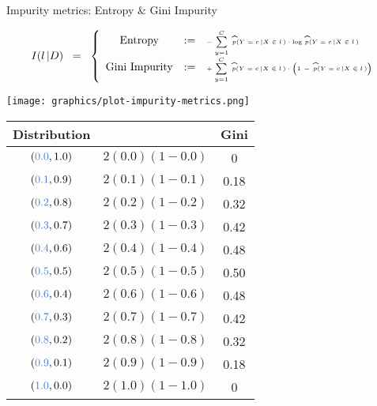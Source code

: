 \begin{frame}{\vskip -0.2cm \Large Impurity metrics: Entropy \& Gini Impurity}

\vskip -0.2cm
\tiny
\begin{equation*}
I(l\,\vert D)
\;\; = \;\;
\left\{\begin{array}{ccl}
\textnormal{Entropy}
& := &
	\textnormal{\tiny$-\;\overset{C}{\underset{y=1}{\sum}}\;\,
	\widehat{p}(Y=c\,\vert X\in l\,) \cdot \log\,\widehat{p}(Y=c\,\vert X\in l\,)$}
\\
\textnormal{Gini Impurity}
& := &
	\textnormal{\tiny$+\;\overset{C}{\underset{y=1}{\sum}}\;\,
	\widehat{p}(Y=c\,\vert X\in l\,) \cdot
	\left(\overset{{\color{white}.}}{1}\,-\,\widehat{p}(Y=c\,\vert X\in l\,)\right)$}
\end{array}\right.
\end{equation*}

\begin{multicols}{2}

	\begin{minipage}{4.5cm}
	\begin{flushright}
	\texttt{[image: graphics/plot-impurity-metrics.png]}
	\end{flushright}
	\end{minipage}

\columnbreak

	\begin{minipage}{4.5cm}
	\begin{flushright}
	{\normalsize
	\begin{tabular}{|c|c|c|}
	\hline
	{\small Distribution} && {\small Gini} \\
	\hline \hline
	$({\color{gcblue}0.0}, 1.0)$ & \textnormal{\tiny$2(0.0)(1-0.0)$} & 0 \\
	$({\color{gcblue}0.1}, 0.9)$ & \textnormal{\tiny$2(0.1)(1-0.1)$} & 0.18 \\
	$({\color{gcblue}0.2}, 0.8)$ & \textnormal{\tiny$2(0.2)(1-0.2)$} & 0.32 \\
	$({\color{gcblue}0.3}, 0.7)$ & \textnormal{\tiny$2(0.3)(1-0.3)$} & 0.42 \\
	$({\color{gcblue}0.4}, 0.6)$ & \textnormal{\tiny$2(0.4)(1-0.4)$} & 0.48 \\
	$({\color{gcblue}0.5}, 0.5)$ & \textnormal{\tiny$2(0.5)(1-0.5)$} & 0.50 \\
	$({\color{gcblue}0.6}, 0.4)$ & \textnormal{\tiny$2(0.6)(1-0.6)$} & 0.48 \\
	$({\color{gcblue}0.7}, 0.3)$ & \textnormal{\tiny$2(0.7)(1-0.7)$} & 0.42 \\
	$({\color{gcblue}0.8}, 0.2)$ & \textnormal{\tiny$2(0.8)(1-0.8)$} & 0.32 \\
	$({\color{gcblue}0.9}, 0.1)$ & \textnormal{\tiny$2(0.9)(1-0.9)$} & 0.18 \\
	$({\color{gcblue}1.0}, 0.0)$ & \textnormal{\tiny$2(1.0)(1-1.0)$} & 0      \\
	\hline
	\end{tabular}
	}
	\end{flushright}
	\end{minipage}

\end{multicols}

\end{frame}
